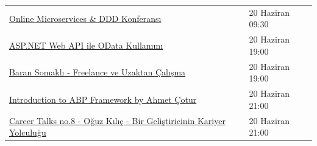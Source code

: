 \documentclass[11pt]{article}
\begin{document}
\begin{longtable}{|p{9.5cm}|l|}
\href{https://kommunity.com/devnot-yazilimci-bulusmalari/events/online-microservices-ddd-konferansi-560b28ae}{Online Microservices \& DDD Konferansı} & 20 Haziran 09:30\\
\href{https://kommunity.com/bilge-adam-teknoloji/events/aspnet-web-api-ile-odata-kullanimi-4d505a79}{ASP.NET Web API ile OData Kullanımı} & 20 Haziran 19:00\\
\href{https://kommunity.com/acmhacettepe/events/baran-somakli-freelance-ve-uzaktan-calisma-acsdays-11-004cb0e7}{Baran Somaklı - Freelance ve Uzaktan Çalışma} & 20 Haziran 19:00\\
\href{https://kommunity.com/microsoft-student-partners-turkiye/events/introduction-to-abp-framework-by-ahmet-cotur-fad979a2}{Introduction to ABP Framework by Ahmet Çotur} & 20 Haziran 21:00\\
\href{https://kommunity.com/istanbul-bilisim-toplulugu/events/career-talks-8-oguz-kilic-bir-gelistiricinin-kariyer-yolculugu-93f87bdd}{Career Talks no.8 - Oğuz Kılıç - Bir Geliştiricinin Kariyer Yolculuğu} & 20 Haziran 21:00\\
\hline
\end{longtable}
\end{document}
